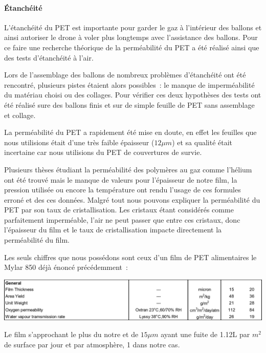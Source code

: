\documentclass[a4paper,11pt]{article}
\begin{document}
\paragraph{Étanchéité}

L'étanchéité du PET est importante pour garder le gaz à l'intérieur des ballons et ainsi autoriser le drone à voler plus longtemps avec l'assistance des ballons. Pour ce faire une recherche théorique de la perméabilité du PET a été réalisé ainsi que des tests d'étanchéité à l'air.

Lors de l'assemblage des ballons de nombreux problèmes d'étanchéité ont été rencontré, plusieurs pistes étaient alors possibles~: le manque de imperméabilité du matériau choisi ou des collages. Pour vérifier ces deux hypothèses des tests ont été réalisé sure des ballons finis et sur de simple feuille de PET sans assemblage et collage.


La perméabilité du PET a rapidement été mise en doute, en effet les feuilles que nous utilisions était d'une très faible épaisseur ($12\mu m$) et sa qualité était incertaine car nous utilisions du PET de couvertures de survie.

Plusieurs thèses étudiant la perméabilité des polymères au gaz comme l'hélium ont été trouvé mais le manque de valeurs pour l'épaisseur de notre film, la pression utilisée ou encore la température ont rendu l'usage de ces formules erroné et des ces données.
Malgré tout nous pouvons expliquer la perméabilité du PET par son taux de cristallisation. Les cristaux étant considérés comme parfaitement imperméable, l'air ne peut passer que entre ces cristaux, donc l'épaisseur du film et le taux de cristallisation impacte directement la perméabilité du film.

Les seuls chiffres que nous possédons sont ceux d'un film de PET alimentaires le Mylar 850 déjà énoncé précédemment~:

\begin{center}
 \includegraphics[width=15cm]{../Images/permeabilite.png}
\end{center}

Le film s'approchant le plus du notre et de $15\mu m$ ayant une fuite de 1.12L par $m^2$ de surface par jour et par atmosphère, 1 dans notre cas.
\end{document}
